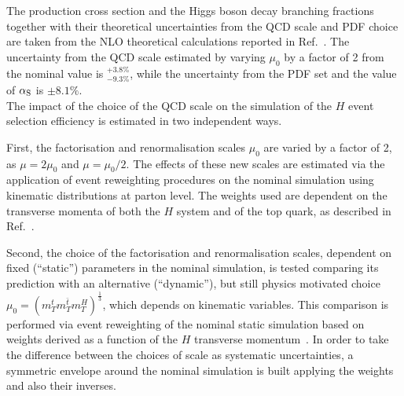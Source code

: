 The production cross section and the Higgs boson decay branching fractions together with their theoretical uncertainties from the QCD scale and PDF choice are taken from the NLO theoretical calculations reported in Ref.~\cite{Heinemeyer:2013tqa}. The uncertainty from the QCD scale estimated by varying $\mu_{0}$ by a factor of 2 from the nominal value is $^{+3.8\%}_{-9.3\%}$, while the uncertainty from the PDF set and the value of $\alpha_{\rm S}$ is $\pm 8.1\%$.\\

The impact of the choice of the QCD scale on the simulation of the \ttbar$H$ event selection efficiency is estimated in two independent ways. 

First, the factorisation and renormalisation scales $\mu_{0}$ are varied by a factor of 2, as $\mu = 2\mu_{0}$ and $\mu = \mu_{0}/2$. The effects of these new scales are estimated via the application of event reweighting procedures on the nominal simulation using kinematic distributions at parton level. The weights used are dependent on the transverse momenta of both the \ttbar$H$ system and of the top quark, as described in Ref.~\cite{Guindon:1638000}. 

Second, the choice of the factorisation and renormalisation scales, dependent on fixed (``static'') parameters in the nominal simulation, is tested comparing its prediction with an alternative (``dynamic''), but still physics motivated choice $\mu_{0} = (m_{T}^{t}m_{T}^{\bar{t}}m_{T}^{H})^{\frac{1}{3}}$, which depends on kinematic variables. This comparison is performed via event reweighting of the nominal static simulation based on weights derived as a function of the \ttbar$H$ transverse momentum~\cite{Guindon:1638000}. In order to take the difference between the choices of scale as systematic uncertainties, a symmetric envelope around the nominal simulation is built applying the weights and also their inverses.

